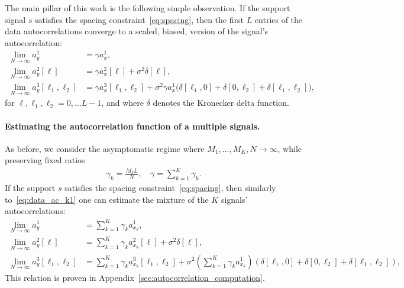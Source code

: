 \documentclass[english,11pt]{article}
\newcommand{\1}{\mathbf{1}}
\numberwithin{equation}{section}
\theoremstyle{plain}
\theoremstyle{definition}
\theoremstyle{remark}
\theoremstyle{plain}
\theoremstyle{remark}
\theoremstyle{plain}
\theoremstyle{plain}
\begin{document}
The main pillar of this work is the following simple observation.
If the support signal $s$ satisfies the spacing constraint~\eqref{eq:spacing}, then the first $L$ entries of the data autocorrelations converge 
to a scaled, biased, version of the signal's autocorrelation:
\begin{align} 
\lim_{N\to\infty} a_y^1 & = \gamma a_{x}^1, \nonumber\\
\lim_{N\to\infty} a_y^2[\ell] & = \gamma a_{x}^2[\ell] +\sigma^2\delta[\ell], \label{eq:data_ac_k1} \\
\lim_{N\to\infty} a_y^3[\ell_1,\ell_2] & = \gamma a_{x}^3[\ell_1,\ell_2] + \sigma^2\gamma a_{x}^1 \big(\delta[\ell_1,0]+\delta[0,\ell_2]+\delta[\ell_1,\ell_2]\big), \nonumber
\end{align}
for $\ell,\ell_1,\ell_2=0,\ldots L-1$, and where $\delta$ denotes the Kronecker delta function. 

\paragraph{Estimating the autocorrelation function of a multiple signals.}

As before, we consider  the asymptomatic regime where $M_1,\ldots,M_K,N\to\infty$, while preserving fixed ratios
\begin{align}
	\gamma_k = \frac{M_k L}{N}, \quad \gamma = \sum_{k=1}^K\gamma_k.
\end{align}
If the support $s$ satisfies the spacing constraint~\eqref{eq:spacing}, then  similarly to~\eqref{eq:data_ac_k1} one can estimate the mixture of the $K$ signals'  autocorrelations:
\begin{align}
\lim_{N\to\infty} a_y^1 & = \sum_{k=1}^K\gamma_k a_{x_k}^1, \nonumber\\
\lim_{N\to\infty} a_y^2[\ell] & = \sum_{k=1}^K\gamma_k a_{x_k}^2[\ell] +\sigma^2\delta[\ell],  \label{eq:data_ac}\\
\lim_{N\to\infty} a_y^3[\ell_1,\ell_2] & = \sum_{k=1}^K\gamma_k a_{x_k}^3[\ell_1,\ell_2] + \sigma^2\left(\sum_{k=1}^K\gamma_k a_{x_k}^1\right)(\delta[\ell_1,0]+\delta[0,\ell_2]+\delta[\ell_1,\ell_2]), \nonumber
\end{align}
This relation is proven in  Appendix~\ref{sec:autocorrelation_computation}.
\end{document}

